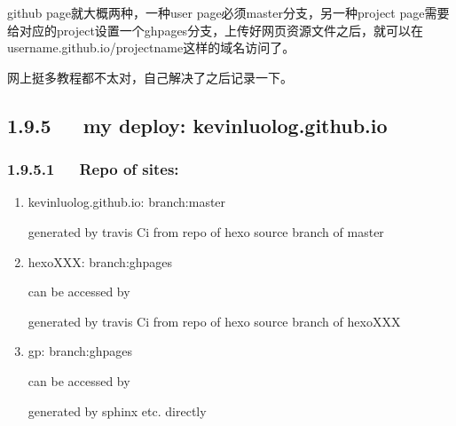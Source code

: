 \documentclass[letterpaper,12pt,english]{sphinxmanual}
\begin{document}
github page就大概两种，一种user page必须master分支，另一种project page需要给对应的project设置一个gh\sphinxhyphen{}pages分支，上传好网页资源文件之后，就可以在username.github.io/projectname这样的域名访问了。

网上挺多教程都不太对，自己解决了之后记录一下。


\subsection{1.9.5   my deploy: kevinluolog.github.io}
\label{\detokenize{001software/001install/001._u7f51_u7ad9/hexo:my-deploy-kevinluolog-github-io}}

\subsubsection{1.9.5.1   Repo of sites:}
\label{\detokenize{001software/001install/001._u7f51_u7ad9/hexo:repo-of-sites}}\begin{enumerate}
%
\item {} 
kevinluolog.github.io: branch:master

generated by travis Ci from repo of hexo source \sphinxhyphen{} branch of master

\item {} 
hexo\sphinxhyphen{}XXX: branch:gh\sphinxhyphen{}pages

can be accessed by 

generated by travis Ci from repo of hexo source \sphinxhyphen{} branch of hexo\sphinxhyphen{}XXX

\item {} 
gp: branch:gh\sphinxhyphen{}pages

can be accessed by 

generated by sphinx etc. directly

\end{enumerate}
\end{document}

